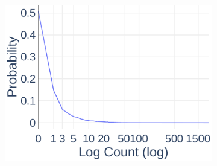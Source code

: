 \begin{figure}[ht]
\begin{subfigure}[b]{0.3\textwidth}
    \includegraphics[width=\textwidth]{Figures/Data-Log-PDF}
  \end{subfigure}
	\vspace*{1em}


\end{figure}
